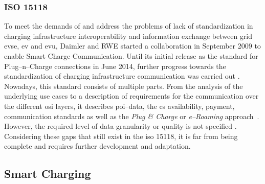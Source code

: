 \subsubsection{ISO 15118}
\label{ch:Fundamentals:sec:Electric Mobility:ssec:Relevant Standards:sssec:ISO 15118}

To meet the demands of  and address the problems of lack of standardization in charging infrastructure interoperability and information exchange between grid \acrshort{evse}, \acrshort{ev} and \acrshort{evu}, Daimler and RWE started a collaboration in September 2009 to enable Smart Charge Communication.
Until its initial release as the standard for Plug--n--Charge connections in June 2014, further progress towards the standardization of charging infrastructure communication was carried out \cite{heinrich_iso_2017}.
Nowadays, this standard consists of multiple parts. From the analysis of the underlying use cases to a description of requirements for the communication over the different \acrshort{osi} layers, it describes \acrshort{poi}--data, the \acrshort{cs} availability, payment, communication standards as well as the \textit{Plug \& Charge} or \textit{e--Roaming} approach~\cite{brosi_methode_2019}.
However, the required level of data granularity or quality is not specified \cite{linnemann_elektromobilitat_2020}. Considering these gaps that still exist in the \acrshort{iso} 15118, it is far from being complete and requires further development and adaptation.

\subsection{Smart Charging}
\label{ch:Fundamentals:sec:Electric Mobility:ssec:Smart Charging}


